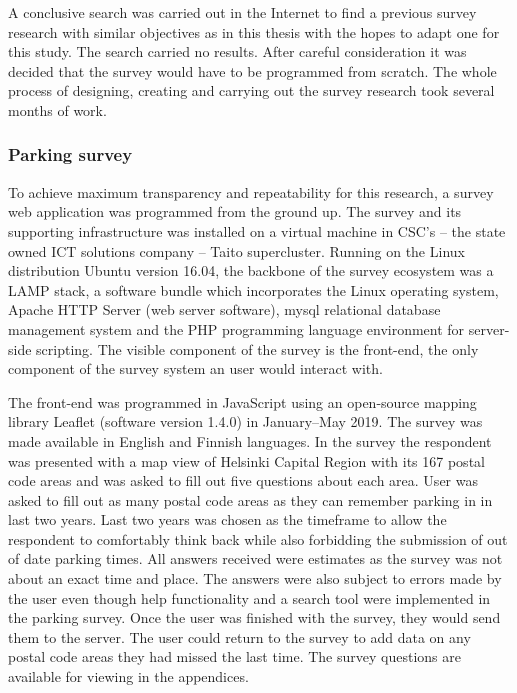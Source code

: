 A conclusive search was carried out in the Internet to find a previous survey research with similar objectives as in this thesis with the hopes to adapt one for this study. The search carried no results. After careful consideration it was decided that the survey would have to be programmed from scratch. The whole process of designing, creating and carrying out the survey research took several months of work.

\subsubsection{Parking survey}
\justify
To achieve maximum transparency and repeatability for this research, a survey web application was programmed from the ground up. The survey and its supporting infrastructure was installed on a virtual machine in CSC's -- the state owned ICT solutions company -- Taito supercluster. Running on the Linux distribution Ubuntu version 16.04, the backbone of the survey ecosystem was a LAMP stack, a software bundle which incorporates the Linux operating system, Apache HTTP Server (web server software), \gls{mysql} relational database management system and the PHP programming language environment for server-side scripting. The visible component of the survey is the front-end, the only component of the survey system an user would interact with.

The front-end was programmed in JavaScript using an open-source mapping library Leaflet (software version 1.4.0) in January--May 2019. The survey was made available in English and Finnish languages. In the survey the respondent was presented with a map view of Helsinki Capital Region with its 167 postal code areas and was asked to fill out five questions about each area. User was asked to fill out as many postal code areas as they can remember parking in in last two years. Last two years was chosen as the timeframe to allow the respondent to comfortably think back while also forbidding the submission of out of date parking times. All answers received were estimates as the survey was not about an exact time and place. The answers were also subject to errors made by the user even though help functionality and a search tool were implemented in the parking survey. Once the user was finished with the survey, they would send them to the server. The user could return to the survey to add data on any postal code areas they had missed the last time. The survey questions are available for viewing in the appendices.

